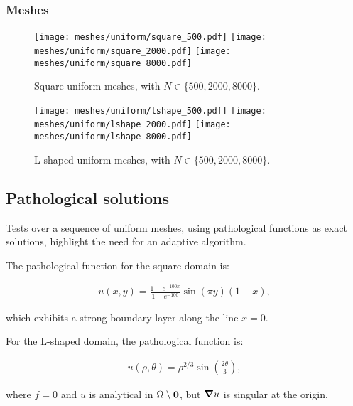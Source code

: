 \newpage
\subsubsection{Meshes}

\begin{figure}[!ht]
	\centering
	\texttt{[image: meshes/uniform/square\_500.pdf]}
	\texttt{[image: meshes/uniform/square\_2000.pdf]}
	\texttt{[image: meshes/uniform/square\_8000.pdf]}
	\caption{Square uniform meshes, with $N \in \{500, 2000, 8000\}$.}
\end{figure}

\begin{figure}[!ht]
	\centering
	\texttt{[image: meshes/uniform/lshape\_500.pdf]}
	\texttt{[image: meshes/uniform/lshape\_2000.pdf]}
	\texttt{[image: meshes/uniform/lshape\_8000.pdf]}
	\caption{L-shaped uniform meshes, with $N \in \{500, 2000, 8000\}$.}
\end{figure}

\newpage
\subsection{Pathological solutions}

Tests over a sequence of uniform meshes, using pathological functions as exact solutions, highlight the need for an adaptive algorithm.

\cite{Antonietti2013} The pathological function for the square domain is:

\begin{gather} \label{pathological_square}
    u(x, y) = \frac{1 - e^{-100x}}{1 - e^{-100}} \sin(\pi y) (1 - x),
\end{gather}

which exhibits a strong boundary layer along the line $x = 0$.

For the L-shaped domain, the pathological function is:

\begin{gather} \label{pathological_lshape}
    u(\rho, \theta) = \rho^{2 / 3} \sin\left(\frac{2 \theta}{3}\right),
\end{gather}

where $f = 0$ and $u$ is analytical in $\Omega \setminus \bm{0}$, but $\bm{\nabla}{u}$ is singular at the origin.

